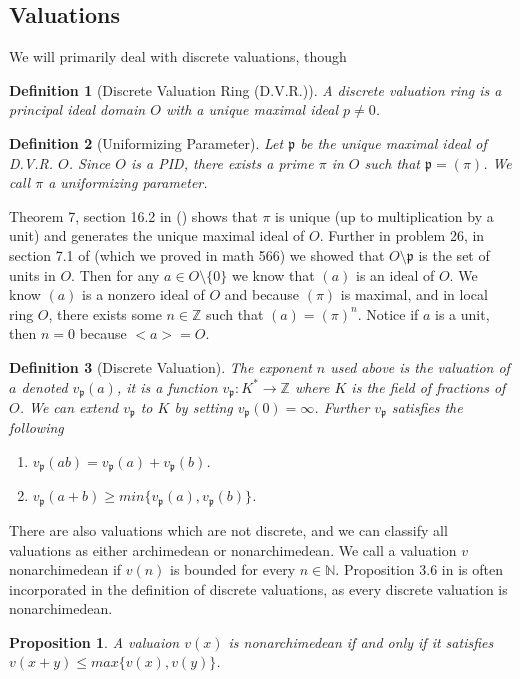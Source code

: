 \documentclass[paper=a4, fontsize=11pt]{scrartcl} %
\numberwithin{equation}{section} %
\numberwithin{figure}{section} %
\numberwithin{table}{section} %
\theoremstyle{break}
\newtheorem{defn}{Definition}
\newtheorem{prop}{Proposition}
\begin{document}
\subsection{Valuations}
We will primarily deal with discrete valuations, though
\begin{defn}[Discrete Valuation Ring (D.V.R.)]
A discrete valuation ring is a principal ideal domain $O$ with a unique maximal ideal $p \not= 0$.
\end{defn}
\begin{defn}[Uniformizing Parameter]
Let $\mathfrak{p}$ be the unique maximal ideal of D.V.R. $O$. Since $O$ is a PID, there exists a prime $\pi$ in $O$ such that $\mathfrak{p}=(\pi)$. We call $\pi$ a uniformizing parameter.
\end{defn}
Theorem 7, section 16.2 in (\cite{DnF}) shows that $\pi$ is unique (up to multiplication by a unit) and generates the unique maximal ideal of $O$. Further in problem 26, in section 7.1 of \cite{DnF} (which we proved in math 566) we showed that $O \setminus \mathfrak{p}$ is the set of units in $O$. Then for any $a\in O\setminus \{0\}$ we know that $(a)$ is an ideal of $O$. We know $(a)$ is a nonzero ideal of $O$ and because $(\pi)$ is maximal, and in local ring $O$, there exists some $n\in \mathbb{Z}$ such that $(a) = (\pi)^n$. Notice if $a$ is a unit, then $n=0$ because $<a>=O$. 
\begin{defn}[Discrete Valuation]
The exponent $n$ used above is the valuation of $a$ denoted $v_\mathfrak{p}(a)$, it is a function $v_\mathfrak{p}:K^* \to \mathbb{Z}$ where $K$ is the field of fractions of $O$. We can extend $v_\mathfrak{p}$ to $K$ by setting $v_\mathfrak{p}(0) = \infty$. Further $v_\mathfrak{p}$ satisfies the following
\begin{enumerate}
\item $v_\mathfrak{p}(ab)=v_\mathfrak{p}(a) + v_\mathfrak{p}(b)$.
\item $v_\mathfrak{p}(a+b) \geq min\{v_\mathfrak{p}(a),v_\mathfrak{p}(b) \}$.
\end{enumerate}
\end{defn}
There are also valuations which are not discrete, and we can classify all valuations as either archimedean or nonarchimedean. We call a valuation $v$ nonarchimedean if $v(n)$ is bounded for every $n\in \mathbb{N}$. Proposition 3.6 in \cite{Neukirch} is often incorporated in the definition of discrete valuations, as every discrete valuation is nonarchimedean.
\begin{prop}
 A valuaion $v(x)$ is nonarchimedean if and only if it satisfies $v(x+y) \leq max\{v(x),v(y)\}$.
\end{prop}
\end{document}
